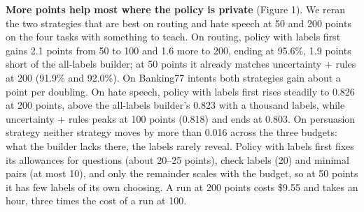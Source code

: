 \documentclass[11pt]{article}
\begin{document}
\textbf{More points help most where the policy is private} (Figure 1). We reran the two strategies that are best on routing and hate speech at 50 and 200 points on the four tasks with something to teach. On routing, policy with labels first gains 2.1 points from 50 to 100 and 1.6 more to 200, ending at 95.6\%, 1.9 points short of the all-labels builder; at 50 points it already matches uncertainty + rules at 200 (91.9\% and 92.0\%). On Banking77 intents both strategies gain about a point per doubling. On hate speech, policy with labels first rises steadily to 0.826 at 200 points, above the all-labels builder's 0.823 with a thousand labels, while uncertainty + rules peaks at 100 points (0.818) and ends at 0.803. On persuasion strategy neither strategy moves by more than 0.016 across the three budgets: what the builder lacks there, the labels rarely reveal. Policy with labels first fixes its allowances for questions (about 20--25 points), check labels (20) and minimal pairs (at most 10), and only the remainder scales with the budget, so at 50 points it has few labels of its own choosing. A run at 200 points costs \$9.55 and takes an hour, three times the cost of a run at 100.
\end{document}
